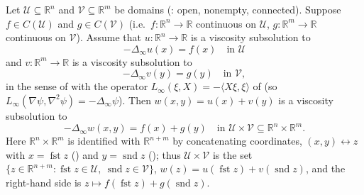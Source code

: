 \begin{theorem}
Let $\mathcal U\subseteq\mathbb R^n$ and $\mathcal V\subseteq\mathbb R^m$ be domains (: open, nonempty, connected). Suppose $f\in C(\mathcal U)$ and $g\in C(\mathcal V)$ (i.e.\ $f:\mathbb R^n\to\mathbb R$ continuous on $\mathcal U$, $g:\mathbb R^m\to\mathbb R$ continuous on $\mathcal V$). Assume that $u:\mathbb R^n\to\mathbb R$ is a viscosity subsolution to
\[
-\Delta_\infty u(x)=f(x)\quad\text{in }\mathcal U
\]
and $v:\mathbb R^m\to\mathbb R$ is a viscosity subsolution to
\[
-\Delta_\infty v(y)=g(y)\quad\text{in }\mathcal V,
\]
in the sense of  with the operator $L_\infty(\xi,X)=-\langle X\xi,\xi\rangle$ of  (so $L_\infty(\nabla\psi,\nabla^2\psi)=-\Delta_\infty\psi$). Then $w(x,y)=u(x)+v(y)$ is a viscosity subsolution to
\[
-\Delta_\infty w(x,y)=f(x)+g(y)\quad\text{in }\mathcal U\times\mathcal V\subseteq\mathbb R^n\times\mathbb R^m .
\]
Here $\mathbb R^n\times\mathbb R^m$ is identified with $\mathbb R^{n+m}$ by concatenating coordinates, $(x,y)\leftrightarrow z$ with $x=\operatorname{fst}z$ () and $y=\operatorname{snd}z$ (); thus $\mathcal U\times\mathcal V$ is the set $\{z\in\mathbb R^{n+m}:\operatorname{fst}z\in\mathcal U,\ \operatorname{snd}z\in\mathcal V\}$, $w(z)=u(\operatorname{fst}z)+v(\operatorname{snd}z)$, and the right-hand side is $z\mapsto f(\operatorname{fst}z)+g(\operatorname{snd}z)$.
\end{theorem}
